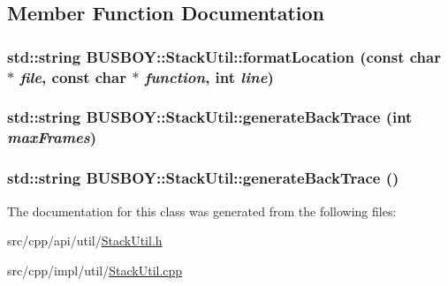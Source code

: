 \subsection{Member Function Documentation}
\hypertarget{classBUSBOY_1_1StackUtil_ad3ca6fdc06fd82aa3b4cc5f1e28c3505}{
\subsubsection[{formatLocation}]{\setlength{\rightskip}{0pt plus 5cm}std::string BUSBOY::StackUtil::formatLocation (const char $\ast$ {\em file}, \/  const char $\ast$ {\em function}, \/  int {\em line})}}
\label{classBUSBOY_1_1StackUtil_ad3ca6fdc06fd82aa3b4cc5f1e28c3505}
\hypertarget{classBUSBOY_1_1StackUtil_a634742686a4182fd639c1af761f756f3}{
\subsubsection[{generateBackTrace}]{\setlength{\rightskip}{0pt plus 5cm}std::string BUSBOY::StackUtil::generateBackTrace (int {\em maxFrames})}}
\label{classBUSBOY_1_1StackUtil_a634742686a4182fd639c1af761f756f3}
\hypertarget{classBUSBOY_1_1StackUtil_a5dcea13d273130cf86eab7e9039bd22e}{
\subsubsection[{generateBackTrace}]{\setlength{\rightskip}{0pt plus 5cm}std::string BUSBOY::StackUtil::generateBackTrace ()}}
\label{classBUSBOY_1_1StackUtil_a5dcea13d273130cf86eab7e9039bd22e}


The documentation for this class was generated from the following files:\begin{DoxyCompactItemize}
\item 
src/cpp/api/util/\hyperlink{StackUtil_8h}{StackUtil.h}\item 
src/cpp/impl/util/\hyperlink{StackUtil_8cpp}{StackUtil.cpp}\end{DoxyCompactItemize}
